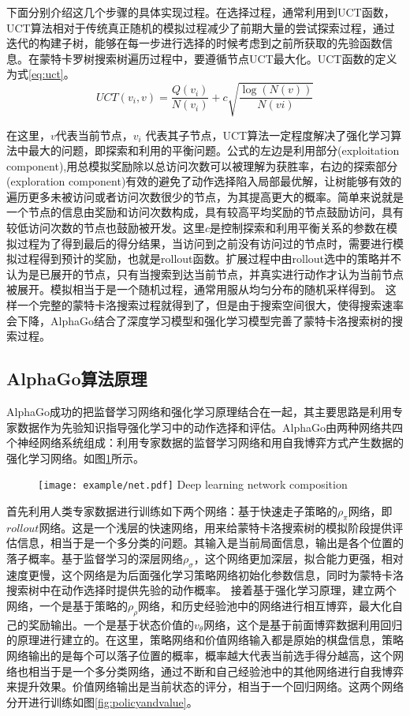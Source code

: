 下面分别介绍这几个步骤的具体实现过程。在选择过程，通常利用到UCT函数，UCT算法相对于传统真正随机的模拟过程减少了前期大量的尝试探索过程，通过迭代的构建子树，能够在每一步进行选择的时候考虑到之前所获取的先验函数信息。在蒙特卡罗树搜索树遍历过程中，要遵循节点UCT最大化。UCT函数的定义为式\ref{eq:uct}。
\begin{equation}
\label{eq:uct}
UCT({v_i},v) = \frac{{Q({v_i})}}{{N({v_i})}} + c\sqrt {\frac{{\log (N(v))}}{{N(vi)}}} 
\end{equation}

在这里，$v$代表当前节点，$ v_i$ 代表其子节点，UCT算法一定程度解决了强化学习算法中最大的问题，即探索和利用的平衡问题。公式的左边是利用部分(exploitation component),用总模拟奖励除以总访问次数可以被理解为获胜率，右边的探索部分(exploration component)有效的避免了动作选择陷入局部最优解，让树能够有效的遍历更多未被访问或者访问次数很少的节点，为其提高更大的概率。简单来说就是一个节点的信息由奖励和访问次数构成，具有较高平均奖励的节点鼓励访问，具有较低访问次数的节点也鼓励被开发。这里$c$是控制探索和利用平衡关系的参数在模拟过程为了得到最后的得分结果，当访问到之前没有访问过的节点时，需要进行模拟过程得到预计的奖励，也就是rollout函数。扩展过程中由rollout选中的策略并不认为是已展开的节点，只有当搜索到达当前节点，并真实进行动作才认为当前节点被展开。模拟相当于是一个随机过程，通常用服从均匀分布的随机采样得到。
这样一个完整的蒙特卡洛搜索过程就得到了，但是由于搜索空间很大，使得搜索速率会下降，AlphaGo结合了深度学习模型和强化学习模型完善了蒙特卡洛搜索树的搜索过程。

\subsection{AlphaGo算法原理}
AlphaGo成功的把监督学习网络和强化学习原理结合在一起，其主要思路是利用专家数据作为先验知识指导强化学习中的动作选择和评估。AlphaGo由两种网络共四个神经网络系统组成：利用专家数据的监督学习网络和用自我博弈方式产生数据的强化学习网络。如图\ref{fig:net}所示。

\begin{figure}[htbp]
	\centering
	\texttt{[image: example/net.pdf]}
	{Deep learning network composition}
	\label{fig:net}
\end{figure}

首先利用人类专家数据进行训练如下两个网络：基于快速走子策略的${\rho _\pi }$网络，即$roll out$网络。这是一个浅层的快速网络，用来给蒙特卡洛搜索树的模拟阶段提供评估信息，相当于是一个多分类的问题。其输入是当前局面信息，输出是各个位置的落子概率。基于监督学习的深层网络${\rho _\sigma }$，这个网络更加深层，拟合能力更强，相对速度更慢，这个网络是为后面强化学习策略网络初始化参数信息，同时为蒙特卡洛搜索树中在动作选择时提供先验的动作概率。
接着基于强化学习原理，建立两个网络，一个是基于策略的${\rho _\rho }$网络，和历史经验池中的网络进行相互博弈，最大化自己的奖励输出。一个是基于状态价值的${v_\theta }$网络，这个是基于前面博弈数据利用回归的原理进行建立的。在这里，策略网络和价值网络输入都是原始的棋盘信息，策略网络输出的是每个可以落子位置的概率，概率越大代表当前选手得分越高，这个网络也相当于是一个多分类网络，通过不断和自己经验池中的其他网络进行自我博弈来提升效果。价值网络输出是当前状态的评分，相当于一个回归网络。这两个网络分开进行训练如图\ref{fig:policyandvalue}。

